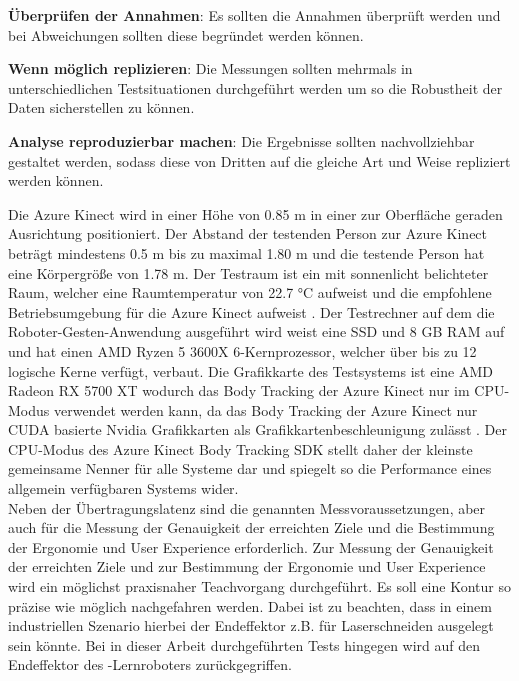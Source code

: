 \begin{compactenumerate}
    \item \textbf{Überprüfen der Annahmen}: Es sollten die Annahmen überprüft werden und bei Abweichungen sollten diese begründet werden können.
    \item \textbf{Wenn möglich replizieren}: Die Messungen sollten mehrmals in unterschiedlichen Testsituationen durchgeführt werden um so die Robustheit der Daten sicherstellen zu können.
    \item \textbf{Analyse reproduzierbar machen}: Die Ergebnisse sollten nachvollziehbar gestaltet werden, sodass diese von Dritten auf die gleiche Art und Weise repliziert werden können.
\end{compactenumerate}

Die Azure Kinect wird in einer Höhe von \num{0,85} m in einer zur Oberfläche geraden Ausrichtung positioniert. Der Abstand der testenden Person zur Azure Kinect beträgt mindestens \num{0,5} m bis zu maximal \num{1,80} m und die testende Person hat eine Körpergröße von \num{1,78} m. Der Testraum ist ein mit sonnenlicht belichteter Raum, welcher eine Raumtemperatur von \num{22,7} °C aufweist und die empfohlene Betriebsumgebung für die Azure Kinect aufweist \cite{tesych_azure_nodate}. Der Testrechner auf dem die Roboter-Gesten-Anwendung ausgeführt wird weist eine SSD und 8 GB RAM auf und hat einen AMD Ryzen 5 3600X 6-Kernprozessor, welcher über bis zu 12 logische Kerne verfügt, verbaut. Die Grafikkarte des Testsystems ist eine AMD Radeon RX 5700 XT wodurch das Body Tracking der Azure Kinect nur im CPU-Modus verwendet werden kann, da das Body Tracking der Azure Kinect nur CUDA basierte Nvidia Grafikkarten als Grafikkartenbeschleunigung zulässt \cite{encausse_body_nodate}. Der CPU-Modus des Azure Kinect Body Tracking SDK stellt daher der kleinste gemeinsame Nenner für alle Systeme dar und spiegelt so die Performance eines allgemein verfügbaren Systems wider.\\

Neben der Übertragungslatenz sind die genannten Messvoraussetzungen, aber auch für die Messung der Genauigkeit der erreichten Ziele und die Bestimmung der Ergonomie und User Experience erforderlich. Zur Messung der Genauigkeit der erreichten Ziele und zur Bestimmung der Ergonomie und User Experience wird ein möglichst praxisnaher Teachvorgang durchgeführt. Es soll eine Kontur so präzise wie möglich nachgefahren werden. Dabei ist zu beachten, dass in einem industriellen Szenario hierbei der Endeffektor z.B. für Laserschneiden ausgelegt sein könnte. Bei in dieser Arbeit durchgeführten Tests hingegen wird auf den Endeffektor des -Lernroboters zurückgegriffen.

